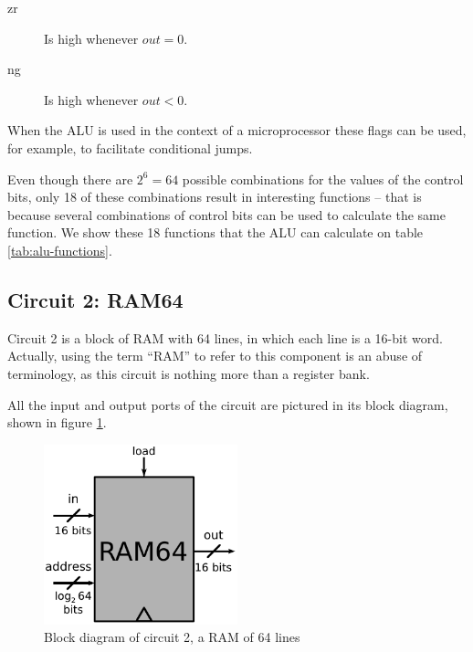 \documentclass[a4paper]{article}
\begin{document}
            \begin{description}
                \item[zr] Is high whenever $out = 0$.
                \item[ng] Is high whenever $out < 0$.
            \end{description}

            When the ALU is used in the context of a microprocessor these flags can be used, for
            example, to facilitate conditional jumps.

            Even though there are $2^{6} = 64$ possible combinations for the values of the control
            bits, only 18 of these combinations result in interesting functions -- that is because
            several combinations of control bits can be used to calculate the same function. We show
            these 18 functions that the ALU can calculate on table \ref{tab:alu-functions}.
            



        \subsection{Circuit 2: RAM64}
        \label{subsec:ram-circuit}
            Circuit 2 is a block of RAM with 64 lines, in which each line is a 16-bit word.
            Actually, using the term ``RAM'' to refer to this component is an abuse of terminology,
            as this circuit is nothing more than a register bank.

            All the input and output ports of the circuit are pictured in its block diagram, shown
            in figure \ref{fig:ram-block}.

            \begin{figure}[h!]
                \begin{center}
                    \includegraphics[width=0.5\textwidth]{imgs/ram-block.pdf}
                \end{center}
                \caption{Block diagram of circuit 2, a RAM of 64 lines
                    \label{fig:ram-block}}
            \end{figure}
\end{document}
